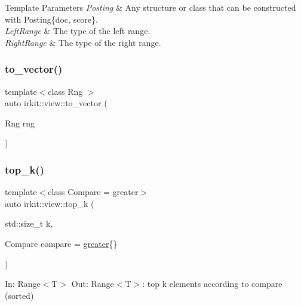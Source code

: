 \begin{DoxyTemplParams}{Template Parameters}
{\em Posting} & Any structure or class that can be constructed with {\ttfamily Posting\{doc, score\}}. \\
\hline
{\em Left\+Range} & The type of the left range. \\
\hline
{\em Right\+Range} & The type of the right range. \\
\hline
\end{DoxyTemplParams}
\mbox{\label{namespaceirkit_1_1view_a47e3af80728642c02c0204e1db2ecbd4}} 
\subsubsection{\texorpdfstring{to\+\_\+vector()}{to\_vector()}}
{\footnotesize\ttfamily template$<$class Rng $>$ \\
auto irkit\+::view\+::to\+\_\+vector (\begin{DoxyParamCaption}\item[{Rng}]{rng }\end{DoxyParamCaption})}

\mbox{\label{namespaceirkit_1_1view_a0c54fd641ca22e5cb97fd55a3f5921a2}} 
\subsubsection{\texorpdfstring{top\+\_\+k()}{top\_k()}\hspace{0.1cm}{\footnotesize\ttfamily [1/2]}}
{\footnotesize\ttfamily template$<$class Compare  = greater$>$ \\
auto irkit\+::view\+::top\+\_\+k (\begin{DoxyParamCaption}\item[{std\+::size\+\_\+t}]{k,  }\item[{Compare}]{compare = {\ttfamily \hyperlink{structirkit_1_1view_1_1greater}{greater}\{\}} }\end{DoxyParamCaption})}

In\+: Range$<$\+T$>$ Out\+: Range$<$\+T$>$\+: top k elements according to compare (sorted) \mbox{\label{namespaceirkit_1_1view_a94331e22539c88bf23e8d801c004fee2}} 
